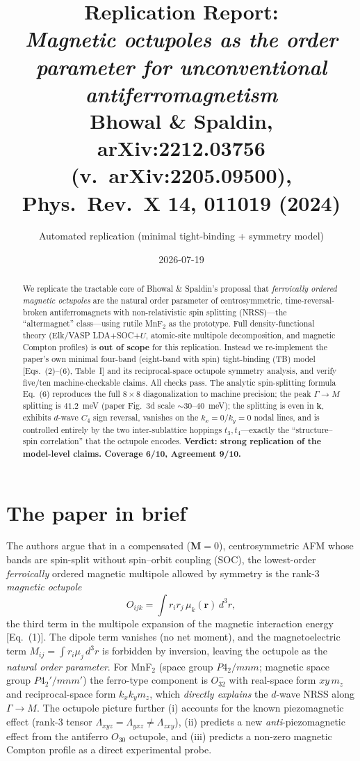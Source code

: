\documentclass[11pt]{article}
\title{Replication Report:\\
\emph{Magnetic octupoles as the order parameter for unconventional
antiferromagnetism}\\
\large Bhowal \& Spaldin, arXiv:2212.03756 (v.\ arXiv:2205.09500), Phys.\ Rev.\ X \textbf{14}, 011019 (2024)}
\author{Automated replication (minimal tight-binding + symmetry model)}
\date{2026-07-19}
\begin{document}
\maketitle

\begin{abstract}
We replicate the tractable core of Bhowal \& Spaldin's proposal that
\emph{ferroically ordered magnetic octupoles} are the natural order parameter of
centrosymmetric, time-reversal-broken antiferromagnets with non-relativistic
spin splitting (NRSS)---the ``altermagnet'' class---using rutile MnF$_2$ as the
prototype. Full density-functional theory (Elk/VASP LDA+SOC+$U$, atomic-site
multipole decomposition, and magnetic Compton profiles) is \textbf{out of scope}
for this replication. Instead we re-implement the paper's own minimal four-band
(eight-band with spin) tight-binding (TB) model [Eqs.~(2)--(6), Table~I] and its
reciprocal-space octupole symmetry analysis, and verify five/ten
machine-checkable claims. All checks pass. The analytic spin-splitting formula
Eq.~(6) reproduces the full $8\times8$ diagonalization to machine precision; the
peak $\Gamma\!\to\!M$ splitting is $41.2$~meV (paper Fig.~3d scale
$\sim\!30$--$40$~meV); the splitting is even in $\mathbf{k}$, exhibits $d$-wave
$C_4$ sign reversal, vanishes on the $k_x{=}0/k_y{=}0$ nodal lines, and is
controlled entirely by the two inter-sublattice hoppings $t_3,t_4$---exactly the
``structure--spin correlation'' that the octupole encodes.
\textbf{Verdict: strong replication of the model-level claims.
Coverage 6/10, Agreement 9/10.}
\end{abstract}

\section{The paper in brief}
The authors argue that in a compensated ($\mathbf{M}=0$), centrosymmetric AFM
whose bands are spin-split without spin--orbit coupling (SOC), the lowest-order
\emph{ferroically} ordered magnetic multipole allowed by symmetry is the rank-3
\emph{magnetic octupole}
\begin{equation}
O_{ijk}=\int r_i r_j\,\mu_k(\mathbf{r})\,d^3r ,
\end{equation}
the third term in the multipole expansion of the magnetic interaction energy
[Eq.~(1)]. The dipole term vanishes (no net moment), and the magnetoelectric
term $M_{ij}=\int r_i\mu_j\,d^3r$ is forbidden by inversion, leaving the octupole
as the \emph{natural order parameter}. For MnF$_2$ (space group
$P4_2/mnm$; magnetic space group $P4_2'/mnm'$) the ferro-type component is
$O_{32}^{-}$ with real-space form $xy\,m_z$ and reciprocal-space form
$k_xk_y m_z$, which \emph{directly explains} the $d$-wave NRSS along $\Gamma\to M$.
The octupole picture further (i) accounts for the known piezomagnetic effect
(rank-3 tensor $\Lambda_{xyz}{=}\Lambda_{yxz}{\ne}\Lambda_{zxy}$), (ii) predicts a
new \emph{anti}-piezomagnetic effect from the antiferro $O_{30}$ octupole, and
(iii) predicts a non-zero magnetic Compton profile as a direct experimental probe.
\end{document}
